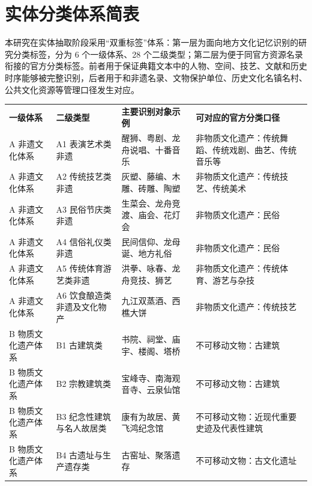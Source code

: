 \chapter{实体分类体系简表}\label{ux5b9eux4f53ux5206ux7c7bux4f53ux7cfbux7b80ux8868}

本研究在实体抽取阶段采用``双重标签''体系：第一层为面向地方文化记忆识别的研究分类标签，分为 6 个一级体系、28 个二级类型；第二层为便于同官方资源名录衔接的官方分类标签。前者用于保证典籍文本中的人物、空间、技艺、文献和历史时序能够被完整识别，后者用于和非遗名录、文物保护单位、历史文化名镇名村、公共文化资源等管理口径发生对应。

{\def\LTcaptype{none} %
\begin{longtable}[]{@{}
  >{\centering\arraybackslash}p{}
  >{\centering\arraybackslash}p{}
  >{\centering\arraybackslash}p{}
  >{\centering\arraybackslash}p{}@{}}
\toprule\noalign{}
\endhead
\bottomrule\noalign{}
\endlastfoot
\textbf{一级体系} & \textbf{二级类型} & \textbf{主要识别对象示例} & \textbf{可对应的官方分类口径} \\
A 非遗文化体系 & A1 表演艺术类非遗 & 醒狮、粤剧、龙舟说唱、十番音乐 & 非物质文化遗产：传统舞蹈、传统戏剧、曲艺、传统音乐等 \\
A 非遗文化体系 & A2 传统技艺类非遗 & 灰塑、藤编、木雕、砖雕、陶塑 & 非物质文化遗产：传统技艺、传统美术 \\
A 非遗文化体系 & A3 民俗节庆类非遗 & 生菜会、龙舟竞渡、庙会、花灯会 & 非物质文化遗产：民俗 \\
A 非遗文化体系 & A4 信俗礼仪类非遗 & 民间信仰、龙母诞、地方礼俗 & 非物质文化遗产：民俗 \\
A 非遗文化体系 & A5 传统体育游艺类非遗 & 洪拳、咏春、龙舟竞技、狮艺 & 非物质文化遗产：传统体育、游艺与杂技 \\
A 非遗文化体系 & A6 饮食酿造类非遗及文化物产 & 九江双蒸酒、西樵大饼 & 非物质文化遗产：传统技艺 \\
B 物质文化遗产体系 & B1 古建筑类 & 书院、祠堂、庙宇、楼阁、塔桥 & 不可移动文物：古建筑 \\
B 物质文化遗产体系 & B2 宗教建筑类 & 宝峰寺、南海观音寺、云泉仙馆 & 不可移动文物：古建筑 \\
B 物质文化遗产体系 & B3 纪念性建筑与名人故居类 & 康有为故居、黄飞鸿纪念馆 & 不可移动文物：近现代重要史迹及代表性建筑 \\
B 物质文化遗产体系 & B4 古遗址与生产遗存类 & 古窑址、聚落遗存 & 不可移动文物：古文化遗址 \\

\end{longtable}}
